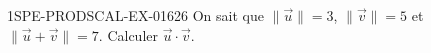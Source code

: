 \begin{exercice}{1SPE-PRODSCAL-EX-016}{2}{6}
On sait que $\|\vec{u}\| = 3$, $\|\vec{v}\| = 5$ et $\|\vec{u} + \vec{v}\| = 7$. Calculer $\vec{u} \cdot \vec{v}$.
\end{exercice}
